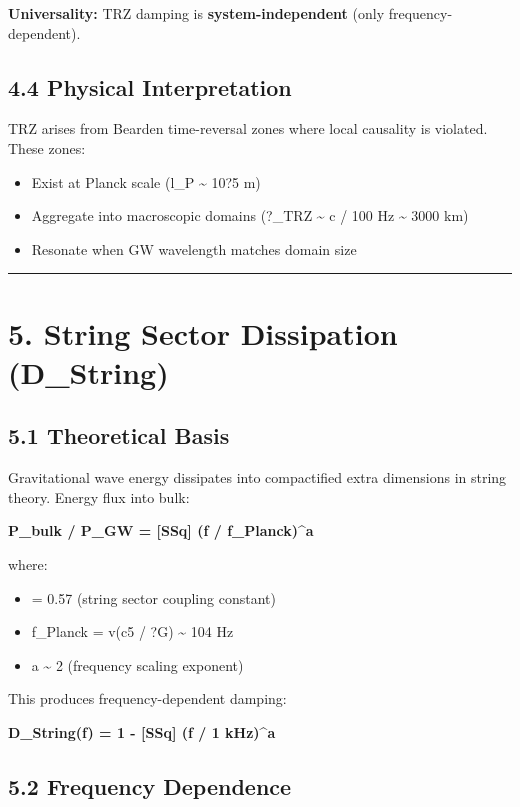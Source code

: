 \documentclass[11pt]{article}
\begin{document}
\textbf{Universality:} TRZ damping is \textbf{system-independent} (only frequency-dependent).

\subsection*{4.4 Physical Interpretation}

TRZ arises from Bearden time-reversal zones where local causality is violated. These zones:

\begin{itemize}
  \item Exist at Planck scale (l\_P \textasciitilde{} 10?5 m)
  \item Aggregate into macroscopic domains (?\_TRZ \textasciitilde{} c / 100 Hz \textasciitilde{} 3000 km)
  \item Resonate when GW wavelength matches domain size
\end{itemize}

\noindent\rule{\textwidth}{0.4pt}

\section*{5. String Sector Dissipation (D\_String)}

\subsection*{5.1 Theoretical Basis}

Gravitational wave energy dissipates into compactified extra dimensions in string theory. Energy flux into bulk:

\textbf{P\_bulk / P\_GW = [SSq]  (f / f\_Planck)\textasciicircum{}a}

where:

\begin{itemize}
  \item [SSq] = 0.57 (string sector coupling constant)
  \item f\_Planck = v(c5 / ?G) \textasciitilde{} 104 Hz
  \item a \textasciitilde{} 2 (frequency scaling exponent)
\end{itemize}

This produces frequency-dependent damping:

\textbf{D\_String(f) = 1 - [SSq]  (f / 1 kHz)\textasciicircum{}a}

\subsection*{5.2 Frequency Dependence}
\end{document}
